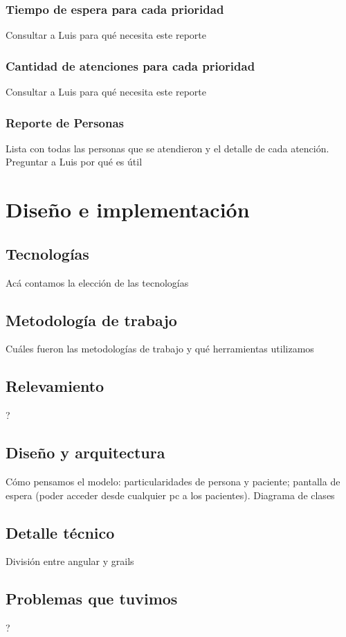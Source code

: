 \documentclass[a4paper,10pt]{article}
\begin{document}
\subsubsection{Tiempo de espera para cada prioridad}
Consultar a Luis para qué necesita este reporte
\subsubsection{Cantidad de atenciones para cada prioridad}
Consultar a Luis para qué necesita este reporte
\subsubsection{Reporte de Personas}
Lista con todas las personas que se atendieron y el detalle de cada atención. Preguntar a Luis por qué es útil

\newpage 
\section{Diseño e implementación}
\subsection{Tecnologías}
Acá contamos la elección de las tecnologías

\subsection{Metodología de trabajo}
Cuáles fueron las metodologías de trabajo y qué herramientas utilizamos

\subsection{Relevamiento}
?

\subsection{Diseño y arquitectura}
Cómo pensamos el modelo: particularidades de persona y paciente; pantalla de espera (poder acceder desde cualquier pc a los pacientes).
Diagrama de clases 

\subsection{Detalle técnico}
División entre angular y grails

\subsection{Problemas que tuvimos}
?
\end{document}
